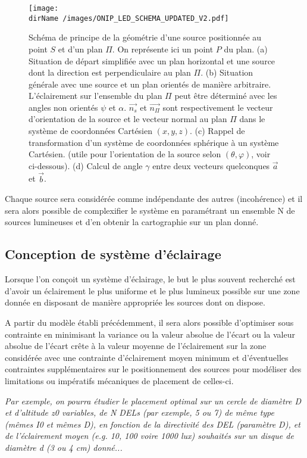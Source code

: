 \begin{figure}[h]
	\centering
	\texttt{[image: \\dirName /images/ONIP\_LED\_SCHEMA\_UPDATED\_V2.pdf]}
	\caption{Schéma de principe de la géométrie d'une source positionnée au point $S$ et d'un plan $\Pi$. On représente ici un point $P$ du plan.
	(a) Situation de départ simplifiée avec un plan horizontal et une source dont la direction est perpendiculaire au plan $\Pi$. 
	(b) Situation générale avec une source et un plan orientés de manière arbitraire. L'éclairement sur l'ensemble du plan $\Pi$ peut être déterminé avec les angles non orientés $\psi$ et $\alpha$. $\vec{n_s}$ et $\vec{n_\Pi}$ sont respectivement le vecteur d'orientation de la source et le vecteur normal au plan $\Pi$ dans le système de coordonnées Cartésien $(x, y, z)$. 
	(c) Rappel de transformation d'un système de coordonnées sphérique à un système Cartésien. (utile pour l'orientation de la source selon $(\theta, \varphi)$, voir ci-dessous). 
	(d) Calcul de angle $\gamma$ entre deux vecteurs quelconques $\vec{a}$ et $\vec{b}$.}
	\label{schema}
\end{figure}

Chaque source sera considérée comme indépendante des autres (incohérence) et il sera alors possible de complexifier le système en paramétrant un ensemble N de sources lumineuses et d'en obtenir la cartographie sur un plan donné.

\subsection{Conception de système d'éclairage}

Lorsque l'on conçoit un système d'éclairage, le but le plus souvent recherché est d'avoir un éclairement le plus uniforme et le plus lumineux possible sur une zone donnée en disposant de manière appropriée les sources dont on dispose. 

\medskip

A partir du modèle établi précédemment, il sera alors possible d'optimiser sous contrainte en minimisant la variance ou la valeur absolue de l'écart ou la valeur absolue de l'écart crête à la valeur moyenne de l'éclairement sur la zone considérée avec une contrainte d'éclairement moyen minimum et d'éventuelles contraintes supplémentaires sur le positionnement des sources pour modéliser des limitations ou impératifs mécaniques de placement de celles-ci.

\medskip

\textit{Par exemple, on pourra étudier le placement optimal sur un cercle de diamètre D et d'altitude z0 variables, de N DELs (par exemple, 5 ou 7) de même type (mêmes I0 et mêmes D), en fonction de la directivité des DEL (paramètre D), et de l'éclairement moyen (e.g. 10, 100 voire 1000 lux) souhaités sur un disque de diamètre d (3 ou 4 cm) donné... }


